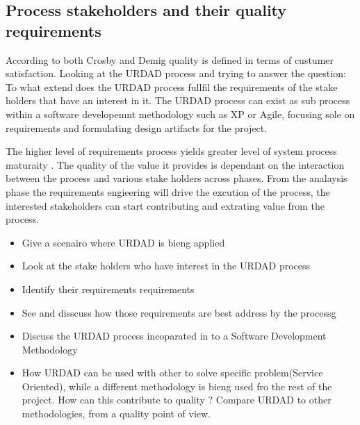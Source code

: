 
\subsection{Process stakeholders and their quality requirements}

According to both Crosby and Demig quality is defined in terms of custumer satisfaction. Looking at the URDAD process and trying to answer the 
question: To what extend does the URDAD process fullfil the requirements of the stake holders that have an interest in it. The URDAD process can
exist as sub process within a software developemnt methodology such as XP or Agile, focusing sole on requirements and formulating design 
artifacts for the project.


The higher level of requirements process yields greater level of system process maturaity \cite  {Boehm_20Viev_Century_SE}. 
The quality of the value it provides is dependant on the interaction between the process and various stake holders across phases.
From the analaysis phase the requirements engieering will drive the excution of the process, the interested stakeholders can start contributing and extrating value from the process.  




\begin {itemize}
 \item Give a scenairo where URDAD is bieng applied
 \item Look at the stake holders who have interest in the URDAD process 
 \item Identify their requirements requirements
 \item See and disscuss how those requirements are best address by the processg
\end {itemize}

\begin {itemize}
 \item Discuss the URDAD process incoparated in to a Software Development Methodology
 \item How URDAD can be used with other to solve specific problem(Service Oriented),
  while a different methodology is bieng used fro the rest of the project. How can this contribute to quality ?
  Compare URDAD to other methodologies, from a quality point of view.
\end {itemize}


\cite{berard_what_1995}

